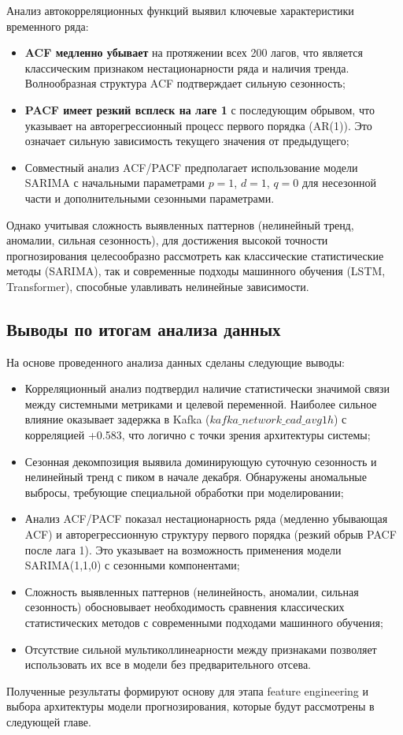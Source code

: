 Анализ автокорреляционных функций выявил ключевые характеристики временного ряда:

\begin{itemize}
	\item \textbf{ACF медленно убывает} на протяжении всех 200 лагов, что является классическим признаком нестационарности ряда и наличия тренда. Волнообразная структура ACF подтверждает сильную сезонность;
	\item \textbf{PACF имеет резкий всплеск на лаге 1} с последующим обрывом, что указывает на авторегрессионный процесс первого порядка (AR(1)). Это означает сильную зависимость текущего значения от предыдущего;
	\item Совместный анализ ACF/PACF предполагает использование модели \\SARIMA с начальными параметрами $p=1$, $d=1$, $q=0$ для несезонной части и дополнительными сезонными параметрами.
\end{itemize}

Однако учитывая сложность выявленных паттернов (нелинейный тренд, аномалии, сильная сезонность), для достижения высокой точности прогнозирования целесообразно рассмотреть как классические статистические методы (SARIMA), так и современные подходы машинного обучения (LSTM, Transformer), способные улавливать нелинейные зависимости.

\subsection{Выводы по итогам анализа данных}

На основе проведенного анализа данных сделаны следующие выводы:

\begin{itemize}
	\item Корреляционный анализ подтвердил наличие статистически значимой связи между системными метриками и целевой переменной. Наиболее сильное влияние оказывает задержка в Kafka ($kafka\_network\_cad\_avg1h$) с корреляцией +0.583, что логично с точки зрения архитектуры системы;
	\item Сезонная декомпозиция выявила доминирующую суточную сезонность и нелинейный тренд с пиком в начале декабря. Обнаружены аномальные выбросы, требующие специальной обработки при моделировании;
	\item Анализ ACF/PACF показал нестационарность ряда (медленно убывающая ACF) и авторегрессионную структуру первого порядка (резкий обрыв PACF после лага 1). Это указывает на возможность применения модели SARIMA(1,1,0) с сезонными компонентами;
	\item Сложность выявленных паттернов (нелинейность, аномалии, сильная сезонность) обосновывает необходимость сравнения классических статистических методов с современными подходами машинного обучения;
	\item Отсутствие сильной мультиколлинеарности между признаками позволяет использовать их все в модели без предварительного отсева.
\end{itemize}

Полученные результаты формируют основу для этапа feature engineering и выбора архитектуры модели прогнозирования, которые будут рассмотрены в следующей главе.

